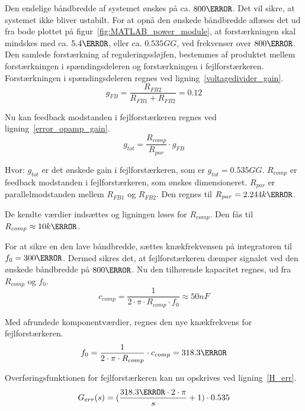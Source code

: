 Den endelige båndbredde af systemet ønskes på ca. $800\hertz$. Det vil sikre, at systemet ikke bliver ustabilt. For at opnå den ønskede båndbredde aflæses det ud fra bode plottet på figur~\ref{fig:MATLAB_power_module}, at forstærkningen skal mindskes med ca. $5.4\decibel$, eller ca. $0.535GG$, ved frekvenser over $800\hertz$. Den samlede forstærkning af reguleringssløjfen, bestemmes af produktet mellem forstærkningen i spændingsdeleren og forstærkningen i fejlforstærkeren. Forstærkningen i spændingsdeleren regnes ved ligning~\ref{voltagedivider_gain}.
\begin{equation} \label{voltagedivider_gain}
g_{FB} = \frac{R_{FB2}}{R_{FB1}+R_{FB2}} = 0.12
\end{equation}

\noindent Nu kan feedback modstanden i fejlforstærkeren regnes ved ligning~\ref{error_opamp_gain}. 
\begin{equation} \label{error_opamp_gain}
g_{tot} = \frac{R_{comp}}{R_{par}} \cdot g_{FB}
\end{equation}

\noindent Hvor:
\newline \noindent $g_{tot}$ er det ønskede gain i fejlforstærkeren, som er $g_{tot}=0.535GG$.
\newline \noindent $R_{comp}$ er feedback modstanden i fejlforstærkeren, som ønskes dimensioneret.
\newline \noindent $R_{par}$ er parallelmodstanden mellem $R_{FB1}$ og $R_{FB2}$. Den regnes til $R_{par}=2.244k\ohm$.

\noindent De kendte værdier indsættes og ligningen løses for $R_{comp}$. Den fås til $R_{comp}\approx 10k\ohm$.


\noindent For at sikre en den lave båndbredde, sættes knækfrekvensen på integratoren til $f_0=300\hertz$. Dermed sikres det, at fejlforstærkeren dæmper signalet ved den ønskede båndbredde på $800\hertz$. Nu den tilhørende kapacitet regnes, ud fra $R_{comp}$ og $f_0$.
\begin{equation} \label{c_comp}
c_{comp} = \frac{1}{2\cdot \pi \cdot R_{comp} \cdot f_0} \approx 50nF
\end{equation}

\noindent Med afrundede komponentværdier, regnes den nye knækfrekvens for fejlforstærkeren.
\begin{equation} \label{f_0}
f_0 = \frac{1}{2\cdot \pi \cdot R_{comp}} \cdot c_{comp} = 318.3\hertz
\end{equation}

\noindent Overføringsfunktionen for fejlforstærkeren kan nu opskrives ved ligning~\ref{H_err}.
\begin{equation} \label{H_err}
G_{err}(s) = (\frac{318.3\hertz \cdot 2\cdot\pi}{s} + 1) \cdot 0.535
\end{equation}

